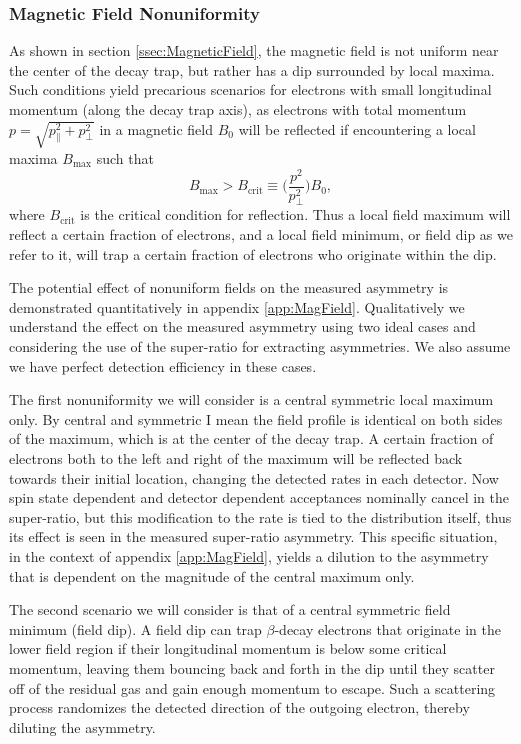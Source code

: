 \subsubsection{Magnetic Field Nonuniformity} \label{sssec:MagFieldSyst}

As shown in section \ref{ssec:MagneticField}, the magnetic field is not uniform
near the center of the decay trap, but rather has a dip surrounded by local maxima.
Such conditions yield precarious scenarios for electrons with small longitudinal momentum
(along the decay trap axis), as electrons with total momentum $p=\sqrt{p_\parallel^2 + p_\perp^2}$
in a magnetic field $B_0$ will be reflected if encountering a local maxima $B_{\mathrm{max}}$ such that
\begin{equation}
  B_{\mathrm{max}} > B_{\mathrm{crit}} \equiv \Big( \frac{p^2}{p_\perp^2} \Big) B_0,
\end{equation}
\noindent where $B_{\mathrm{crit}}$ is the critical condition for reflection. Thus a local field maximum
will reflect a certain fraction of electrons, and a local field minimum, or field dip as
we refer to it, will trap a certain fraction
of electrons who originate within the dip.

The potential effect of nonuniform fields on the measured asymmetry is demonstrated
quantitatively in appendix \ref{app:MagField}. Qualitatively we understand the effect on the
measured asymmetry using two ideal cases and considering the use
of the super-ratio for extracting asymmetries. We also assume we have perfect detection
efficiency in these cases.

The first nonuniformity we will consider
is a central symmetric local maximum only. By central and symmetric I mean the field profile is
identical on both sides of the maximum, which is at the center of the decay trap.
A certain fraction of electrons both to
the left and right of the maximum will be reflected back towards their initial location,
changing the detected rates in each detector. Now spin state dependent and detector dependent
acceptances nominally cancel in the super-ratio, but this modification to the rate is tied
to the distribution itself, thus its effect is seen in the measured super-ratio asymmetry.
This specific situation, in the context of appendix \ref{app:MagField}, yields a dilution
to the asymmetry that is dependent on the magnitude of the central maximum only.

The second scenario we will consider is that of a central symmetric field minimum (field dip).
A field dip can trap $\beta$-decay electrons
that originate in the lower field region if their longitudinal momentum is
below some critical momentum, leaving them bouncing back and forth in the dip until
they scatter off of the residual gas and gain enough momentum to escape. Such a scattering
process randomizes the detected direction of the outgoing electron, thereby diluting the
asymmetry.

